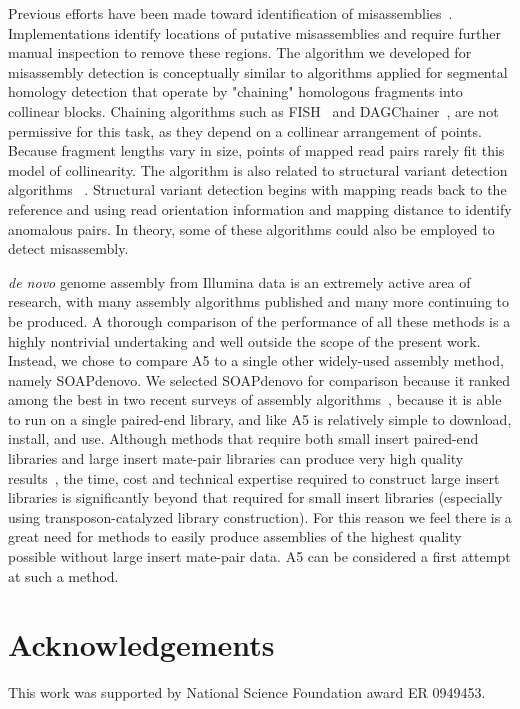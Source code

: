 \documentclass{bioinfo}
\begin{document}
Previous efforts have been made toward identification of misassemblies~\citep{Phillippy2008}. Implementations identify locations of putative 
misassemblies and require further manual inspection to remove these regions. The algorithm we developed for misassembly detection is conceptually 
similar to algorithms applied for segmental homology detection that operate by "chaining" homologous fragments into collinear blocks. Chaining 
algorithms such as FISH~\citep{Calabrese2003} and DAGChainer~\citep{Haas2004}, are not permissive for this task, as they depend on a 
collinear arrangement of points. Because fragment lengths vary in size, points of mapped read pairs rarely fit this model of collinearity. The algorithm is also related to structural variant detection 
algorithms ~\citep{BreakDancer,SVDetect}. Structural variant detection begins with mapping reads back to the reference and using read orientation 
information and mapping distance to identify anomalous pairs. In theory, some of these algorithms could also be employed to detect misassembly.  

\emph{de novo} genome assembly from Illumina data is an extremely active area of research, with many assembly algorithms published and many more continuing to be produced.
A thorough comparison of the performance of all these methods is a highly nontrivial undertaking and well outside the scope of the present  
work. Instead, we chose to compare A5 to a single other widely-used assembly method, namely SOAPdenovo. We selected SOAPdenovo for comparison
because it ranked among the best in two recent surveys of assembly algorithms~\citep{Earl2011,Salzberg2011}, because it is able to run on a single paired-end
library, and like A5 is relatively simple to download, install, and use. Although methods that require both small insert paired-end libraries
and large insert mate-pair libraries can produce very high quality results~\citep{Gnerre2011}, the time, cost and technical expertise required to construct large insert
libraries is significantly beyond that required for small insert libraries (especially using transposon-catalyzed library construction).
For this reason we feel there is a great need for methods to easily produce assemblies of the highest quality possible without large insert mate-pair data.
A5 can be considered a first attempt at such a method.

\section*{Acknowledgements}
This work was supported by National Science Foundation award ER 0949453.
\end{document}
